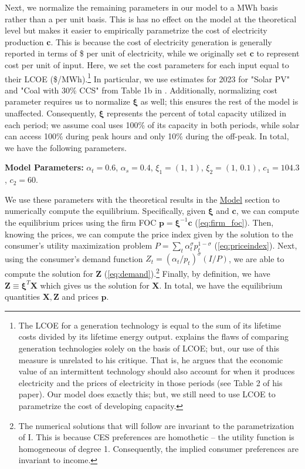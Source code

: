 \documentclass[11pt,a4paper,leqno]{extarticle}
\begin{document}
	Next, we normalize the remaining parameters in our model to a MWh basis rather than a per unit basis. This is has no effect on the model at the theoretical level but makes it easier to empirically parametrize the cost of electricity production $\mathbf{c}$. This is because the cost of electricity generation is generally reported in terms of \$ per unit of electricity, while we originally set $\mathbf{c}$ to represent cost per unit of input. Here, we set the cost parameters for each input equal to their LCOE (\$/MWh).\footnote{ The LCOE for a generation technology is equal to the sum of its lifetime costs divided by its lifetime energy output. \citet{Joskow2011} explains the flaws of comparing generation technologies solely on the basis of LCOE; but,  our use of this measure is unrelated to his critique. That is, he argues that the economic value of an intermittent technology should also account for when it produces electricity and the prices of electricity in those periods (see Table 2 of his paper). Our model does exactly this; but, we still need to  use LCOE to parametrize the cost of developing capacity. 
	} In particular, we use estimates for 2023 for "Solar PV" and "Coal with 30\% CCS" from Table 1b in  \citet{EIALCOE}. Additionally, normalizing cost parameter requires us to normalize $\boldsymbol{\xi}$ as well; this ensures the rest of the model is unaffected. Consequently, $\boldsymbol{\xi}$  represents the percent of total capacity utilized in each period; we assume coal uses 100\% of its capacity in both periods, while solar can access 100\% during peak hours and only 10\% during the off-peak. In total, we have the following parameters. 
	
	\begin{center}
		\noindent \textbf{Model Parameters:} $\alpha_t = 0.6$, $\alpha_s = 0.4$, $\xi_1 = (1, \, 1)$, $\xi_2 = (1, \, 0.1)$, $c_1 = 104.3$, $c_2 = 60$. 
		\label{Params: Example A}
	\end{center}
	
	We use these parameters with the theoretical results in the \hyperref[sec:Model]{Model} section to numerically compute the equilibrium. Specifically, given $\boldsymbol{\xi}$ and $\mathbf{c}$, we can compute the equilibrium prices using the firm FOC $\mathbf{p} = \boldsymbol{\xi}^{-1} \mathbf{c}$ (\autoref{eq:firm_foc}). Then, knowing the prices, we can compute the price index given by the solution to the consumer's utility maximization problem $P = \sum_t \alpha_t^\sigma p_t^{1-\sigma}$ (\autoref{eq:priceindex}). Next, using the consumer's demand function $Z_t = (\alpha_t / p_t)^{\sigma} (I/P)$, we are able to compute the solution for $\mathbf{Z}$ (\autoref{eq:demand}).\footnote{ 
	The numerical solutions that will follow are invariant to the parametrization of I. This is because CES preferences are homothetic -- the utility function is homogeneous of degree 1. Consequently, the implied consumer preferences are invariant to income. 
	} Finally, by definition, we have $\mathbf{Z} \equiv \boldsymbol{\xi}^T \mathbf{X}$ which gives us the solution for $\mathbf{X}$. In total, we have the equilibrium quantities $\mathbf{X}, \mathbf{Z}$ and prices $\mathbf{p}$.
\end{document}
